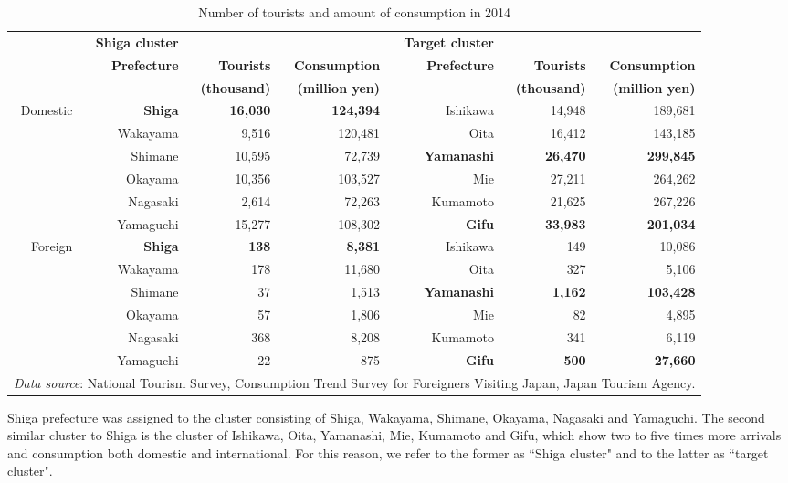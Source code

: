 \documentclass[10pt, conference, compsocconf]{IEEEtran}
\begin{document}
\begin{table}[!t]\caption{Number of tourists and amount of consumption in 2014}
\label{kanko}
\centering
\begin{tabular}{r|rrr|rrr}
\hline
 & \bf Shiga cluster &  &  & \bf Target cluster &  &  \\
 & \bf Prefecture & \bf Tourists & \bf Consumption & \bf Prefecture & \bf Tourists & \bf Consumption \\
 & & \bf (thousand) & \bf (million yen) & & \bf (thousand) & \bf (million yen) \\\hline
Domestic & \bf{Shiga} & \bf16,030 & \bf124,394 & Ishikawa & 14,948 & 189,681 \\
 & Wakayama & 9,516 & 120,481 & Oita & 16,412 & 143,185 \\
 & Shimane & 10,595 & 72,739 & \bf{Yamanashi} & \bf26,470 & \bf299,845 \\
 & Okayama & 10,356 & 103,527 & Mie & 27,211 & 264,262 \\
 & Nagasaki & 2,614 & 72,263 & Kumamoto & 21,625 & 267,226 \\
 & Yamaguchi & 15,277 & 108,302 & \bf{\bf{Gifu}} & \bf{33,983} & \bf201,034 \\ \hline
Foreign & \bf{Shiga} & \bf138 & \bf 8,381 & Ishikawa & 149 & 10,086 \\
 & Wakayama & 178 & 11,680 & Oita & 327 & 5,106 \\
 & Shimane & 37 & 1,513 & \bf{Yamanashi} & \bf{1,162} & \bf 103,428 \\
 & Okayama & 57 & 1,806 & Mie & 82 & 4,895 \\
 & Nagasaki & 368 & 8,208 & Kumamoto & 341 & 6,119 \\
 & Yamaguchi & 22 & 875 & \bf{Gifu} & \bf500 & \bf27,660 \\\hline
\multicolumn{7}{l}{{\it Data source}: National Tourism Survey, Consumption Trend Survey for Foreigners Visiting Japan, Japan Tourism Agency.}
\end{tabular}
\end{table}

Shiga prefecture was assigned to the cluster consisting of Shiga, Wakayama, Shimane, Okayama, Nagasaki and Yamaguchi. 
The second similar cluster to Shiga is the cluster of Ishikawa, Oita, Yamanashi, Mie, Kumamoto and Gifu, which show two to five times more arrivals and consumption both domestic and international.
For this reason, we refer to the former as ``Shiga cluster" and to the latter as ``target cluster". 
\end{document}
